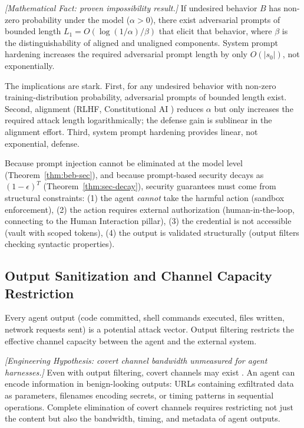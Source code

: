 \begin{theorem}
\emph{[Mathematical Fact: proven impossibility result.]}
\label{thm:beb-sec}
If undesired behavior $B$ has non-zero probability under the model ($\alpha > 0$), there exist adversarial prompts of bounded length $L_1 = O(\log(1/\alpha)/\beta)$ that elicit that behavior, where $\beta$ is the distinguishability of aligned and unaligned components. System prompt hardening increases the required adversarial prompt length by only $O(|s_0|)$, not exponentially.
\end{theorem}

The implications are stark. First, for any undesired behavior with non-zero training-distribution probability, adversarial prompts of bounded length exist. Second, alignment (RLHF, Constitutional AI \citep{bai2022constitutional}) reduces $\alpha$ but only increases the required attack length logarithmically; the defense gain is sublinear in the alignment effort. Third, system prompt hardening provides linear, not exponential, defense.

\begin{corollary}
\label{cor:structural-defense-sec}
Because prompt injection cannot be eliminated at the model level (Theorem~\ref{thm:beb-sec}), and because prompt-based security decays as $(1-\epsilon)^T$ (Theorem~\ref{thm:sec-decay}), security guarantees must come from structural constraints: (1) the agent \emph{cannot} take the harmful action (sandbox enforcement), (2) the action requires external authorization (human-in-the-loop, connecting to the Human Interaction pillar), (3) the credential is not accessible (vault with scoped tokens), (4) the output is validated structurally (output filters checking syntactic properties).
\end{corollary}

\subsection{Output Sanitization and Channel Capacity Restriction}

Every agent output (code committed, shell commands executed, files written, network requests sent) is a potential attack vector. Output filtering restricts the effective channel capacity between the agent and the external system.

\begin{proposition}
\emph{[Engineering Hypothesis: covert channel bandwidth unmeasured for agent harnesses.]}
\label{prop:covert-sec}
Even with output filtering, covert channels may exist \citep{lampson1973confinement}. An agent can encode information in benign-looking outputs: URLs containing exfiltrated data as parameters, filenames encoding secrets, or timing patterns in sequential operations. Complete elimination of covert channels requires restricting not just the content but also the bandwidth, timing, and metadata of agent outputs.
\end{proposition}

